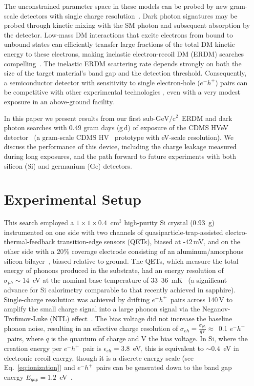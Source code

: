 \documentclass[%
reprint,
superscriptaddress,
preprintnumbers,
amsmath,amssymb,
prl,
aps,
floatfix
]{revtex4-1}
\newcommand{\eh}{$e^-h^+$}
\newcommand{\GeV}{$\mathrm{GeV/c^2}$}
\newcommand{\gd}{g\,d}
\begin{document}
The unconstrained parameter space in these models can be probed by new gram-scale detectors with single charge resolution~\cite{Izaguirre,Essig,Hochberg,An}. Dark photon signatures may be probed through kinetic mixing with the SM photon and subsequent absorption by the detector\cite{Hochberg}. Low-mass DM interactions that excite electrons from bound to unbound states can efficiently transfer large fractions of the total DM kinetic energy to these electrons, making inelastic electron-recoil DM (ERDM) searches compelling~\cite{Essig}. The inelastic ERDM scattering rate depends strongly on both the size of the target material's band gap and the detection threshold. Consequently, a semiconductor detector with sensitivity to single electron-hole (\eh) pairs \cite{Romani, Tiffenberg_17prl_Sensei} can be competitive with other experimental technologies \cite{damic,Xenon10}, even with a very modest exposure in an above-ground facility.

In this paper we present results from our first sub-\GeV~ERDM and dark photon searches with 0.49 gram days (\gd) of exposure of the CDMS HVeV detector~\cite{Romani} (a gram-scale CDMS HV~\cite{Agnese_PRD17_SuperCDMSSensitivity} prototype with eV-scale resolution). We discuss the performance of this device, including the charge leakage measured during long exposures, and the path forward to future experiments with both silicon (Si) and germanium (Ge) detectors.


\section{Experimental Setup}

This search employed a $1{\times}1{\times}0.4$~cm$^3$ high-purity Si crystal (0.93~g) instrumented on one side with two channels of quasiparticle-trap-assisted electro-thermal-feedback transition-edge sensors (QETs), biased at -42\,mV, and on the other side with a 20\% coverage electrode consisting of an aluminum/amorphous silicon bilayer~\cite{Romani}, biased relative to ground. The QETs, which measure the total energy of phonons produced in the substrate, had an energy resolution of $\sigma_{ph} \sim 14$~eV at the nominal base temperature of 33--36~mK~\cite{Romani} (a significant advance for Si calorimetry comparable to that recently achieved in sapphire\cite{Strauss}). Single-charge resolution was achieved by drifting \eh\ pairs across 140\,V to amplify the small charge signal into a large phonon signal via the Neganov-Trofimov-Luke (NTL) effect~\cite{Neganov1985,Luke1988}. The bias voltage did not increase the baseline phonon noise, resulting in an effective charge resolution of $\sigma_{eh}=\frac{\sigma_{ph}}{qV} \approx$~0.1 \eh\ pairs, where $q$ is the quantum of charge and V the bias voltage. In Si, where the creation energy per \eh\ pair is $\epsilon_{eh}=3.8$~eV, this is equivalent to $\sim0.4$~eV in electronic recoil energy, though it is a discrete energy scale (see Eq.~\ref{eq:ionization}) and \eh\ pairs can be generated down to the band gap energy $E_{gap}=1.2$~eV~\cite{Vavilov}.
\end{document}
